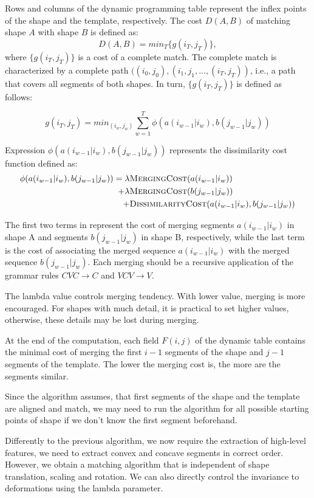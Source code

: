 Rows and columns of the dynamic programming table represent the inflex points of the shape and the template, respectively. The cost $D(A,B)$ of matching shape $A$ with shape $B$ is defined as:
\[ D(A,B) = min_{T} \{g(i_T,j_T)\}, \]
where $\{g(i_T,j_T)\}$ is a cost of a complete match. The complete match is characterized by a complete path $((i_{0},j_{0}),(i_{1},j_{1}, ..., (i_{T},j_{T}))$, i.e., a path that covers all segments of both shapes. In turn, $\{g(i_T,j_T)\}$ is defined as follows:

\[
g(i_{T},j_{T}) = min_(i_w,j_w) \sum_{w=1}^{T} \phi(a(i_{w-1}|i_{w}), b(j_{w-1}|j_{w}))
\]

Expression $\phi(a(i_{w-1}|i_{w}), b(j_{w-1}|j_{w}))$ represents the dissimilarity cost function defined as: 
\begin{align*}
\phi(a(i_{w-1}|i_{w}), b(j_{w-1}|j_{w}))  = \lambda & \textsc{MergingCost}(a(i_{w-1}|i_{w})) \\
+ \lambda & \textsc{MergingCost}(b(j_{w-1}|j_{w})) \\
+ &\textsc{DissimilarityCost}(a(i_{w-1}|i_{w}), b(j_{w-1}|j_{w}))
\end{align*}

The first two terms in represent the cost of merging segments $a(i_{w-1}|i_{w})$ in shape A and segments $b(j_{w-1}|j_{w})$ in shape B, respectively, while the last term is the cost of associating the merged sequence $a(i_{w-1}|i_{w})$ with the merged sequence $b(j_{w-1}|j_{w})$. Each merging should be a recursive application of the grammar rules  $CVC \to C$ and $VCV \to V$.

The lambda value controls merging tendency. With lower value, merging is more encouraged. For shapes with much detail, it is practical to set higher values, otherwise, these details may be lost during merging. 

At the end of the computation, each field $F(i,j)$ of the dynamic table contains the minimal cost of merging the first $i-1$ segments of the shape and $j-1$ segments of the template. The lower the merging cost is, the more are the segments similar. 

Since the algorithm assumes, that first segments of the shape and the template are aligned and match, we may need to run the algorithm for all possible starting points of shape if we don't know the first segment beforehand.

Differently to the previous algorithm, we now require the extraction of high-level features, we need to extract convex and concave segments in correct order. However, we obtain a matching algorithm that is independent of shape translation, scaling and rotation. We can also directly control the invariance to deformations using the lambda parameter.

